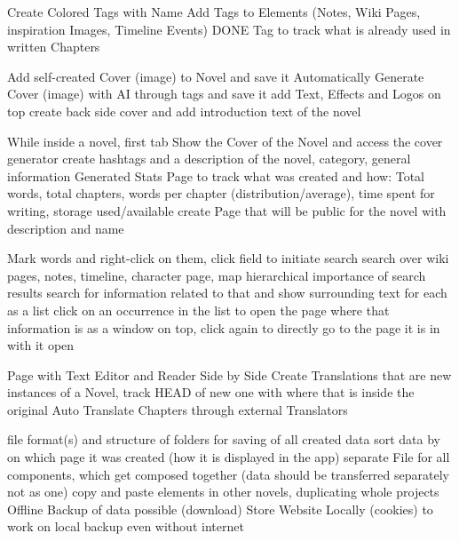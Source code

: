 \begin{outline}
    \1 Create Colored Tags with Name
    \1 Add Tags to Elements (Notes, Wiki Pages, inspiration Images, Timeline Events)
    \1 DONE Tag to track what is already used in written Chapters
\end{outline}

\begin{outline}
    \1 Add self-created Cover (image) to Novel and save it
    \1 Automatically Generate Cover (image) with AI through tags and save it
    \1 add Text, Effects and Logos on top
    \1 create back side cover and add introduction text of the novel
\end{outline}

\begin{outline}
    \1 While inside a novel, first tab
    \1 Show the Cover of the Novel and access the cover generator
    \1 create hashtags and a description of the novel, category, general information
    \1 Generated Stats Page to track what was created and how: Total words, total chapters, words per chapter (distribution/average), time spent for writing, storage used/available
    \1 create Page that will be public for the novel with description and name
\end{outline}

\begin{outline}
    \1 Mark words and right-click on them, click field to initiate search
    \1 search over wiki pages, notes, timeline, character page, map
    \1 hierarchical importance of search results
    \1 search for information related to that and show surrounding text for each as a list
    \1 click on an occurrence in the list to open the page where that information is as a window on top, click again to directly go to the page it is in with it open
\end{outline}

\begin{outline}
    \1 Page with Text Editor and Reader Side by Side
    \1 Create Translations that are new instances of a Novel, track HEAD of new one with where that is inside the original
    \1 Auto Translate Chapters through external Translators
\end{outline}

\begin{outline}
    \1 file format(s) and structure of folders for saving of all created data
    \1 sort data by on which page it was created (how it is displayed in the app)
    \1 separate File for all components, which get composed together (data should be transferred separately not as one)
    \1 copy and paste elements in other novels, duplicating whole projects
    \1 Offline Backup of data possible (download)
    \1 Store Website Locally (cookies) to work on local backup even without internet
\end{outline}

